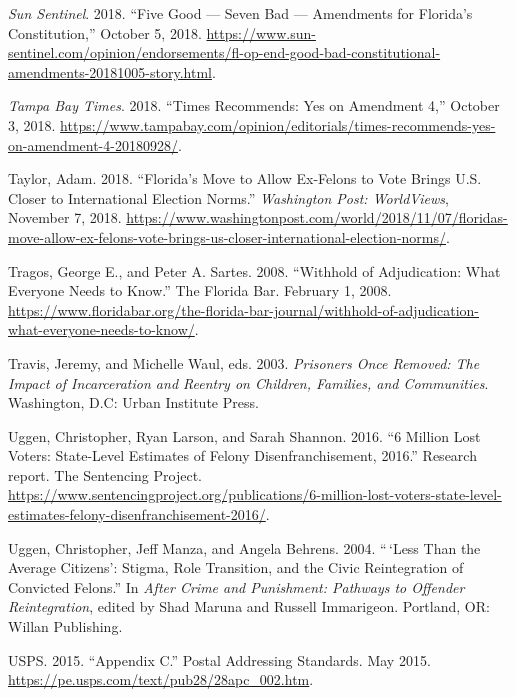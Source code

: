 \documentclass[
  12pt,
]{article}
\newlength{\cslhangindent}
\newenvironment{cslreferences}%
  {\setlength{\parindent}{0pt}%
  \everypar{\setlength{\hangindent}{\cslhangindent}}\ignorespaces}%
  {\par}
\begin{document}
\begin{cslreferences}
\leavevmode\hypertarget{ref-SunSentinelEditorial2018}{}%
\emph{Sun Sentinel}. 2018. ``Five Good --- Seven Bad --- Amendments for Florida's Constitution,'' October 5, 2018. \url{https://www.sun-sentinel.com/opinion/endorsements/fl-op-end-good-bad-constitutional-amendments-20181005-story.html}.

\leavevmode\hypertarget{ref-tampabaytimes2018}{}%
\emph{Tampa Bay Times}. 2018. ``Times Recommends: Yes on Amendment 4,'' October 3, 2018. \url{https://www.tampabay.com/opinion/editorials/times-recommends-yes-on-amendment-4-20180928/}.

\leavevmode\hypertarget{ref-Taylor2018}{}%
Taylor, Adam. 2018. ``Florida's Move to Allow Ex-Felons to Vote Brings U.S. Closer to International Election Norms.'' \emph{Washington Post: WorldViews}, November 7, 2018. \url{https://www.washingtonpost.com/world/2018/11/07/floridas-move-allow-ex-felons-vote-brings-us-closer-international-election-norms/}.

\leavevmode\hypertarget{ref-Tragos2008}{}%
Tragos, George E., and Peter A. Sartes. 2008. ``Withhold of Adjudication: What Everyone Needs to Know.'' The Florida Bar. February 1, 2008. \url{https://www.floridabar.org/the-florida-bar-journal/withhold-of-adjudication-what-everyone-needs-to-know/}.

\leavevmode\hypertarget{ref-Travis2003}{}%
Travis, Jeremy, and Michelle Waul, eds. 2003. \emph{Prisoners Once Removed: The Impact of Incarceration and Reentry on Children, Families, and Communities}. Washington, D.C: Urban Institute Press.

\leavevmode\hypertarget{ref-sentencing_2016}{}%
Uggen, Christopher, Ryan Larson, and Sarah Shannon. 2016. ``6 Million Lost Voters: State-Level Estimates of Felony Disenfranchisement, 2016.'' Research report. The Sentencing Project. \url{https://www.sentencingproject.org/publications/6-million-lost-voters-state-level-estimates-felony-disenfranchisement-2016/}.

\leavevmode\hypertarget{ref-Uggen2004a}{}%
Uggen, Christopher, Jeff Manza, and Angela Behrens. 2004. ``\,`Less Than the Average Citizens': Stigma, Role Transition, and the Civic Reintegration of Convicted Felons.'' In \emph{After Crime and Punishment: Pathways to Offender Reintegration}, edited by Shad Maruna and Russell Immarigeon. Portland, OR: Willan Publishing.

\leavevmode\hypertarget{ref-USPS2015}{}%
USPS. 2015. ``Appendix C.'' Postal Addressing Standards. May 2015. \url{https://pe.usps.com/text/pub28/28apc_002.htm}.


\end{cslreferences}
\end{document}
